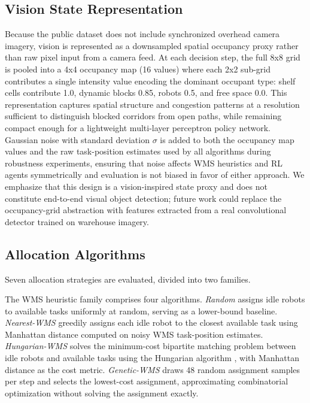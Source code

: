 \documentclass[conference]{IEEEtran}
\begin{document}
\subsection{Vision State Representation}

Because the public dataset does not include synchronized overhead camera imagery, vision is represented as a downsampled spatial occupancy proxy rather than raw pixel input from a camera feed.
At each decision step, the full 8x8 grid is pooled into a 4x4 occupancy map (16 values) where each 2x2 sub-grid contributes a single intensity value encoding the dominant occupant type: shelf cells contribute 1.0, dynamic blocks 0.85, robots 0.5, and free space 0.0.
This representation captures spatial structure and congestion patterns at a resolution sufficient to distinguish blocked corridors from open paths, while remaining compact enough for a lightweight multi-layer perceptron policy network.
Gaussian noise with standard deviation $\sigma$ is added to both the occupancy map values and the raw task-position estimates used by all algorithms during robustness experiments, ensuring that noise affects WMS heuristics and RL agents symmetrically and evaluation is not biased in favor of either approach.
We emphasize that this design is a vision-inspired state proxy and does not constitute end-to-end visual object detection; future work could replace the occupancy-grid abstraction with features extracted from a real convolutional detector trained on warehouse imagery.

\subsection{Allocation Algorithms}

Seven allocation strategies are evaluated, divided into two families.

The WMS heuristic family comprises four algorithms.
\textit{Random} assigns idle robots to available tasks uniformly at random, serving as a lower-bound baseline.
\textit{Nearest-WMS} greedily assigns each idle robot to the closest available task using Manhattan distance computed on noisy WMS task-position estimates.
\textit{Hungarian-WMS} solves the minimum-cost bipartite matching problem between idle robots and available tasks using the Hungarian algorithm \cite{burkard2009assignment}, with Manhattan distance as the cost metric.
\textit{Genetic-WMS} draws 48 random assignment samples per step and selects the lowest-cost assignment, approximating combinatorial optimization without solving the assignment exactly.
\end{document}
